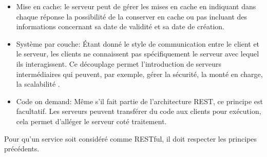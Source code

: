 \documentclass[12pt, a4paper, openany]{report}
\begin{document}
\begin{appendices}
\begin{itemize}
    \item Mise en cache: le serveur peut de gérer les mises en cache en indiquant dans chaque réponse la possibilité de la conserver en cache ou pas incluant des informations concernant sa date de validité et sa date de création. 
      
    \item Système par couche: Étant donné le style de communication entre le client et le serveur, les clients ne connaissent pas spécifiquement le serveur  avec lequel ils interagissent. Ce découplage permet l'introduction de serveurs intermédiaires qui peuvent, par exemple, gérer la sécurité, la monté en charge, la scalabilité .
    
    \item Code on demand: Même s'il fait partie de l'architecture REST, ce principe est facultatif. Les serveurs peuvent transférer du code aux clients pour exécution, cela permet d’alléger le serveur coté traitement.

  \end{itemize}
  
  Pour qu'un service soit considéré comme RESTful, il doit respecter les principes précédents.

\end{appendices}
 


    
\end{document}

